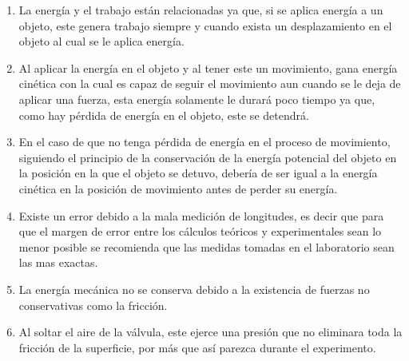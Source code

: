 \documentclass[../main.tex]{subfiles}
\begin{document}
\begin{enumerate}
  \item La energía y el trabajo están relacionadas ya que, si se aplica energía a un objeto, este genera trabajo siempre y cuando exista un desplazamiento en el objeto al cual se le aplica energía.
  \item Al aplicar la energía en el objeto y al tener este un movimiento, gana energía cinética con la cual es capaz de seguir el movimiento aun cuando se le deja de aplicar una fuerza, esta energía solamente le durará poco tiempo ya que, como hay pérdida de energía en el objeto, este se detendrá.
  \item En el caso de que no tenga pérdida de energía en el proceso de movimiento, siguiendo el principio de la conservación de la energía potencial del objeto en la posición en la que el objeto se detuvo, debería de ser igual a la energía cinética en la posición de movimiento antes de perder su energía.
  \item Existe un error debido a la mala medición de longitudes, es decir que para que el margen de error entre los cálculos teóricos y experimentales sean lo menor posible se recomienda que las medidas tomadas en el laboratorio sean las mas exactas.
  \item La energía mecánica no se conserva debido a la existencia de fuerzas no conservativas como la fricción.
  \item Al soltar el aire de la válvula, este ejerce una presión que no eliminara toda la fricción de la superficie, por más que así parezca durante el experimento.
\end{enumerate}
\end{document}
